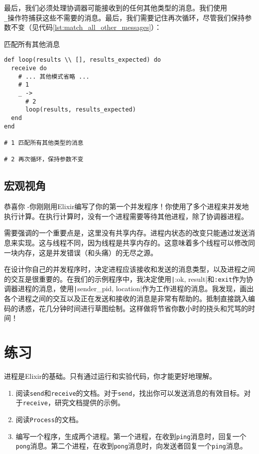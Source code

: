 最后，我们必须处理协调器可能接收到的任何其他类型的消息。我们使用\texttt{\\\_}操作符捕获这些不需要的消息。最后，我们需要记住再次循环，尽管我们保持参数不变（见代码\ref{lst:match_all_other_messages}）：

\begin{code}{匹配所有其他消息}
\begin{verbatim}
def loop(results \\ [], results_expected) do
  receive do
    # ... 其他模式省略 ...
    # 1
    _ ->
      # 2
      loop(results, results_expected)
  end
end

# 1 匹配所有其他类型的消息

# 2 再次循环，保持参数不变
\end{verbatim}
\label{lst:match_all_other_messages}
\end{code}


\subsection{宏观视角}

恭喜你 -你刚刚用Elixir编写了你的第一个并发程序！你使用了多个进程来并发地执行计算。在执行计算时，没有一个进程需要等待其他进程，除了协调器进程。

需要强调的一个重要点是，这里没有共享内存。进程内状态的改变只能通过发送消息来实现。这与线程不同，因为线程是共享内存的。这意味着多个线程可以修改同一块内存，这是并发错误（和头痛）的无尽之源。

在设计你自己的并发程序时，决定进程应该接收和发送的消息类型，以及进程之间的交互是很重要的。在我们的示例程序中，我决定使用\texttt|{:ok, result}|和\texttt{:exit}作为协调器进程的消息，使用\texttt|{sender_pid, location}|作为工作进程的消息。我发现，画出各个进程之间的交互以及正在发送和接收的消息是非常有帮助的。抵制直接跳入编码的诱惑，花几分钟时间进行草图绘制。这样做将节省你数小时的挠头和咒骂的时间！

 \section{练习}

进程是Elixir的基础。只有通过运行和实验代码，你才能更好地理解。

\begin{enumerate}
  \item 阅读\texttt{send}和\texttt{receive}的文档。对于\texttt{send}，找出你可以发送消息的有效目标。对于\texttt{receive}，研究文档提供的示例。
  \item 阅读\texttt{Process}的文档。
  \item 编写一个程序，生成两个进程。第一个进程，在收到\texttt{ping}消息时，回复一个\texttt{pong}消息。第二个进程，在收到\texttt{pong}消息时，向发送者回复一个\texttt{ping}消息。
\end{enumerate}

